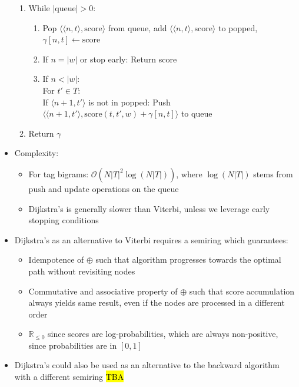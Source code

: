 \begin{itemize}
\begin{enumerate}
        \item While $|\textrm{queue}| > 0$:
        \begin{enumerate}
            \item Pop $\langle \langle n, t \rangle, \textrm{score} \rangle$ from queue, add $\langle \langle n, t \rangle, \textrm{score} \rangle$ to popped, 
            $
            \gamma[n, t] \gets \textrm{score}
            $
            \item If $n = |w|$ or stop early: Return score    
            \item If $n < |w|$:\\
            For $t' \in T$:\\
            If $\langle n+1, t' \rangle$ is not in popped:
            Push
            $
            \langle \langle n+1, t' \rangle, \textrm{score}(t, t', w) + \gamma[n, t] \rangle
            $
            to queue
        \end{enumerate}
        \item Return $\gamma$
    \end{enumerate}
    \item Complexity:
    \begin{itemize}
        \item For tag bigrams: $\mathcal{O}(N |T|^2 \log(N |T|))$, where $\log(N |T|)$ stems from push and update operations on the queue
        \item Dijkstra's is generally slower than Viterbi, unless we leverage early stopping conditions
    \end{itemize}
    \item Dijkstra's as an alternative to Viterbi requires a semiring which guarantees:
    \begin{itemize}
        \item Idempotence of $\oplus$ such that algorithm progresses towards the optimal path without revisiting nodes
        \item Commutative and associative property of $\oplus$ such that score accumulation always yields same result, even if the nodes are processed in a different order
        \item $\mathbb{R}_{\leq0}$ since scores are log-probabilities, which are always non-positive, since probabilities are in $[0,1]$
    \end{itemize}
    \item Dijkstra's could also be used as an alternative to the backward algorithm with a different semiring
    \hl{TBA}
\end{itemize}

